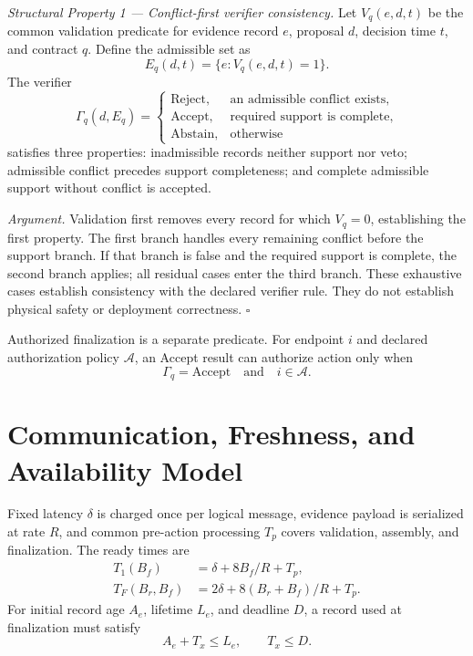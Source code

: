 \emph{Structural Property 1 --- Conflict-first verifier consistency.} Let
$V_q(e,d,t)$
be the common validation predicate for evidence record $e$, proposal $d$,
decision time $t$, and contract $q$. Define the admissible set as
\begin{equation}
E_q(d,t)=\{e:V_q(e,d,t)=1\}.
\end{equation}
The verifier
\begin{equation}
\Gamma_q(d,E_q)=
\begin{cases}
\mathrm{Reject}, & \text{an admissible conflict exists},\\
\mathrm{Accept}, & \text{required support is complete},\\
\mathrm{Abstain},& \text{otherwise}
\end{cases}
\end{equation}
satisfies three properties: inadmissible records neither support nor veto;
admissible conflict precedes support completeness; and complete admissible
support without conflict is accepted.

\emph{Argument.} Validation first removes every record for which $V_q=0$, establishing
the first property. The first branch handles every remaining conflict before
the support branch. If that branch is false and the required support is
complete, the second branch applies; all residual cases enter the third branch.
These exhaustive cases establish consistency with the declared verifier rule.
They do not establish physical safety or deployment correctness.
\hfill$\square$

Authorized finalization is a separate predicate. For endpoint $i$ and declared
authorization policy $\mathcal{A}$, an Accept result can authorize action only
when
\begin{equation}
\Gamma_q=\mathrm{Accept}\quad\text{and}\quad i\in\mathcal{A}.
\end{equation}

\section{Communication, Freshness, and Availability Model}
\label{app:timing}

Fixed latency $\delta$ is charged once per logical message, evidence payload is
serialized at rate $R$, and common pre-action processing $T_p$ covers
validation, assembly, and finalization. The ready times are
\begin{align}
T_{1}(B_f)&=\delta+8B_f/R+T_p,\\
T_{F}(B_r,B_f)&=2\delta+8(B_r+B_f)/R+T_p.
\end{align}
For initial record age $A_e$, lifetime $L_e$, and deadline $D$, a record used at
finalization must satisfy
\begin{equation}
A_e+T_x\leq L_e,\qquad T_x\leq D.
\end{equation}


